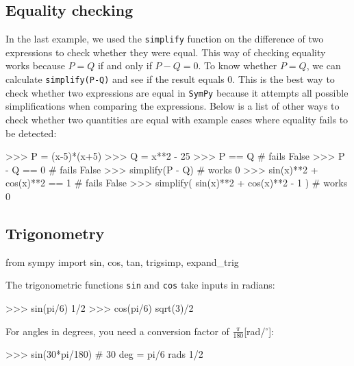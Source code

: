 \subsection{Equality checking}
\label{basics:equality_checking}

In the last example,
we used the \texttt{simplify} function on the difference of two expressions to check whether they were equal.
This way of checking equality works because $P=Q$ if and only if $P-Q=0$.
To know whether $P=Q$, we can calculate \texttt{simplify(P-Q)} and see if the result equals $0$.
This is the best way to check whether two expressions are equal in \texttt{SymPy}
because it attempts all possible simplifications when comparing the expressions.
Below is a list of other ways to check whether two quantities are equal
with example cases where equality fails to be detected:

\small
\begin{verbatimtab}
>>> P = (x-5)*(x+5)
>>> Q = x**2 - 25
>>> P == Q                                    # fails
False
>>> P - Q == 0                                # fails
False
>>> simplify(P - Q)                           # works
0
>>> sin(x)**2 + cos(x)**2  == 1               # fails
False
>>> simplify( sin(x)**2 + cos(x)**2 - 1 )     # works
0
\end{verbatimtab}
\normalsize


\subsection{Trigonometry}
\label{basics:trigonometry}

\small
\begin{verbatimtab}
from sympy import sin, cos, tan, trigsimp, expand_trig
\end{verbatimtab}
\normalsize

\noindent
The trigonometric functions \texttt{sin} and \texttt{cos} take inputs in radians: 					  

\small
\begin{verbatimtab}
>>> sin(pi/6)
1/2
>>> cos(pi/6)
sqrt(3)/2
\end{verbatimtab}
\normalsize

\noindent
For angles in degrees, 
you need a conversion factor of $\frac{\pi}{180}$[rad/$^\circ$]:

\small
\begin{verbatimtab}
>>> sin(30*pi/180)                 # 30 deg = pi/6 rads 
1/2
\end{verbatimtab}
\normalsize

